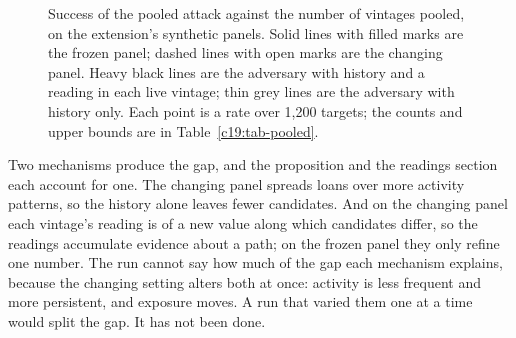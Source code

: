 \begin{figure}[ht]
\centering
{}
\caption{Success of the pooled attack against the number of vintages pooled, on the extension's
synthetic panels. Solid lines with filled marks are the frozen panel; dashed lines with open marks
are the changing panel. Heavy black lines are the adversary with history and a reading in each live
vintage; thin grey lines are the adversary with history only. Each point is a rate over 1,200 targets;
the counts and upper bounds are in Table~\ref{c19:tab-pooled}.}
\label{c19:fig-pooled}
\end{figure}

Two mechanisms produce the gap, and the proposition and the readings section each
account for one. The changing panel spreads loans over more activity patterns, so the history
alone leaves fewer candidates. And on the changing panel each vintage's reading is of a new
value along which candidates differ, so the readings accumulate evidence about a path; on
the frozen panel they only refine one number. The run cannot say how much of the gap
each mechanism explains, because the changing setting alters both at once: activity is less
frequent and more persistent, and exposure moves. A run that varied them one at a time
would split the gap. It has not been done.

